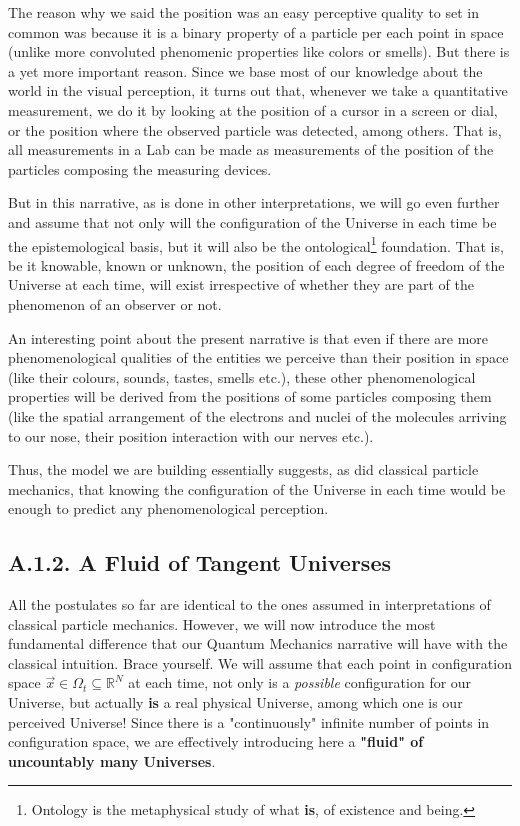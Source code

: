 \documentclass[11pt, a4paper]{article} %
\newcommand{\R}{\mathbb{R}} %
\DeclareRobustCommand{\mybox}[2][gray!10]{%
\begin{tcolorbox}[   %
        left=0.2cm,
        right=0.2cm,
        top=0.15cm,
        bottom=0.15cm,
        colback=#1,
        colframe=#1,
        width=\dimexpr\textwidth\relax, 
        enlarge left by=0mm,
        boxsep=5pt,
        arc=0pt,outer arc=0pt,
        ]
        #2
\end{tcolorbox}
}
\begin{document}
The reason why we said the position was an easy perceptive quality to set in common was because it is a binary property of a particle per each point in space (unlike more convoluted phenomenic properties like colors or smells). But there is a yet more important reason. Since we base most of our knowledge about the world in the visual perception, it turns out that, whenever we take a quantitative measurement, we do it by looking at the position of a cursor in a screen or dial, or the position where the observed particle was detected, among others. That is, all measurements in a Lab can be made as measurements of the position of the particles composing the measuring devices.

But in this narrative, as is done in other interpretations, we will go even further and assume that not only will the configuration of the Universe in each time be the epistemological basis, but it will also be the ontological\footnote{Ontology is the metaphysical study of what {\bf is}, of existence and being.} foundation. That is, be it knowable, known or unknown, the position of each degree of freedom of the Universe at each time, will exist irrespective of whether they are part of the phenomenon of an observer or not.\vspace{-0.1cm}

\mybox{
An interesting point about the present narrative is that even if there are more phenomenological qualities of the entities we perceive than their position in space (like their colours, sounds, tastes, smells etc.), these other phenomenological properties will be derived from the positions of some particles composing them (like the spatial arrangement of the electrons and nuclei of the molecules arriving to our nose, their position interaction with our nerves etc.).} 
\mybox{
Thus, the model we are building essentially suggests, as did classical particle mechanics, that knowing the configuration of the Universe in each time would be enough to predict any phenomenological perception.
}

\subsection*{A.1.2. A Fluid of Tangent Universes}

All the postulates so far are identical to the ones assumed in interpretations of classical particle mechanics. However, we will now introduce the most fundamental difference that our Quantum Mechanics narrative will have with the classical intuition. Brace yourself. We will assume that each point in configuration space $\vec{x}\in\Omega_t\subseteq\R^N$ at each time, not only is a {\em possible} configuration for our Universe, but actually {\bf is} a real physical Universe, among which one is our perceived Universe! Since there is a "continuously" infinite number of points in configuration space, we are effectively introducing here a {\bf "fluid" of uncountably many Universes}.
\end{document}

